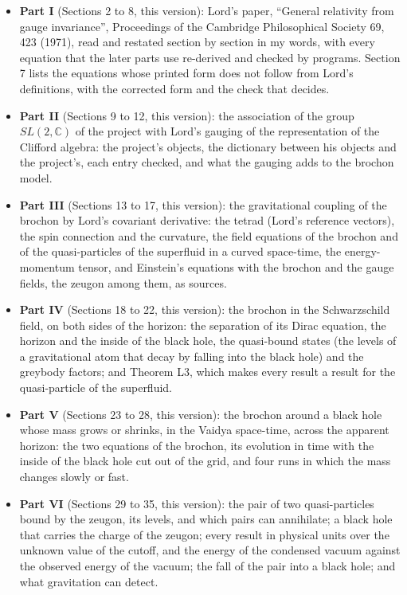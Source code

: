\documentclass[
  10pt,
]{article}
\providecommand{\tightlist}{%
  \setlength{\itemsep}{0pt}\setlength{\parskip}{0pt}}
\begin{document}
\begin{itemize}
\tightlist
\item
  \textbf{Part I} (Sections 2 to 8, this version): Lord's paper,
  ``General relativity from gauge invariance'', Proceedings of the
  Cambridge Philosophical Society 69, 423 (1971), read and restated
  section by section in my words, with every equation that the later
  parts use re-derived and checked by programs. Section 7 lists the
  equations whose printed form does not follow from Lord's definitions,
  with the corrected form and the check that decides.
\item
  \textbf{Part II} (Sections 9 to 12, this version): the association of
  the group \(SL(2,\mathbb C)\) of the project with Lord's gauging of
  the representation of the Clifford algebra: the project's objects, the
  dictionary between his objects and the project's, each entry checked,
  and what the gauging adds to the brochon model.
\item
  \textbf{Part III} (Sections 13 to 17, this version): the gravitational
  coupling of the brochon by Lord's covariant derivative: the tetrad
  (Lord's reference vectors), the spin connection and the curvature, the
  field equations of the brochon and of the quasi-particles of the
  superfluid in a curved space-time, the energy-momentum tensor, and
  Einstein's equations with the brochon and the gauge fields, the zeugon
  among them, as sources.
\item
  \textbf{Part IV} (Sections 18 to 22, this version): the brochon in the
  Schwarzschild field, on both sides of the horizon: the separation of
  its Dirac equation, the horizon and the inside of the black hole, the
  quasi-bound states (the levels of a gravitational atom that decay by
  falling into the black hole) and the greybody factors; and Theorem L3,
  which makes every result a result for the quasi-particle of the
  superfluid.
\item
  \textbf{Part V} (Sections 23 to 28, this version): the brochon around
  a black hole whose mass grows or shrinks, in the Vaidya space-time,
  across the apparent horizon: the two equations of the brochon, its
  evolution in time with the inside of the black hole cut out of the
  grid, and four runs in which the mass changes slowly or fast.
\item
  \textbf{Part VI} (Sections 29 to 35, this version): the pair of two
  quasi-particles bound by the zeugon, its levels, and which pairs can
  annihilate; a black hole that carries the charge of the zeugon; every
  result in physical units over the unknown value of the cutoff, and the
  energy of the condensed vacuum against the observed energy of the
  vacuum; the fall of the pair into a black hole; and what gravitation
  can detect.
\end{itemize}
\end{document}
